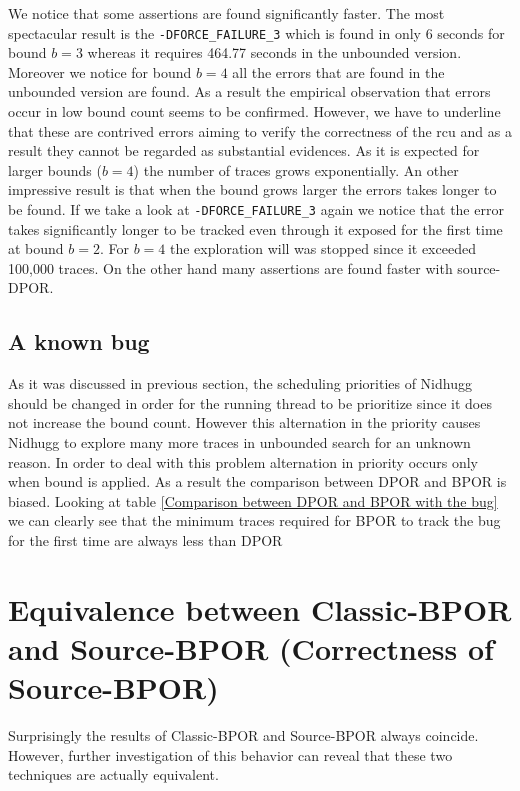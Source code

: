 We notice that some assertions are found significantly faster. The most spectacular result is the
\verb|-DFORCE_FAILURE_3| which is found in only 6 seconds for bound $b=3$ whereas it requires 464.77 seconds in the
unbounded version. Moreover we notice for bound $b=4$ all the errors that are found in the unbounded version are found. As
a result the empirical observation that errors occur in low bound count seems to be confirmed. However, we have to
underline that these are contrived errors aiming to verify the correctness of the rcu and as a result they cannot be
regarded as substantial evidences. As it is expected for larger bounds ($b=4$) the number of traces grows exponentially.
An other impressive result is that when the bound grows larger the errors takes longer to be found. If we take a look at
\verb|-DFORCE_FAILURE_3| again we notice that the error takes significantly longer to be tracked even through it exposed
for the first time at bound $b=2$. For $b=4$ the exploration will was stopped since it exceeded 100,000 traces. On the other
hand many assertions are found faster with source-DPOR.

\subsection{A known bug}
As it was discussed in previous section, the scheduling priorities of Nidhugg should be changed in order for the running
thread to be prioritize since it does not increase the bound count. However this alternation in the priority causes
Nidhugg to explore many more traces in unbounded search for an unknown reason. In order to deal with this problem
alternation in priority occurs only when bound is applied. As a result the comparison between DPOR and BPOR is biased.
Looking at table \ref{Comparison between DPOR and BPOR with the bug} we can clearly see that the minimum traces required
for BPOR to track the bug for the first time are always less than DPOR


\section{Equivalence between Classic-BPOR and Source-BPOR (Correctness of Source-BPOR)}
Surprisingly the results of Classic-BPOR and Source-BPOR always coincide. However, further investigation of this
behavior can reveal that these two techniques are actually equivalent. 

